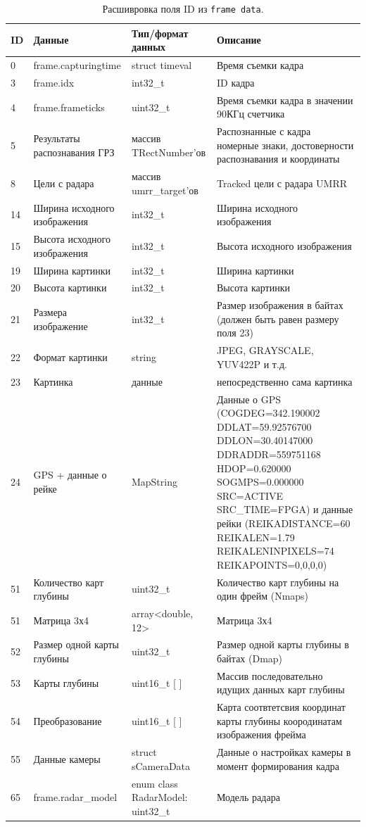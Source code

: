 \documentclass[specification,annotation,times]{itmo-student-thesis}
\begin{document}
	\begin{center}
		\begin{longtable}{|p{}|p{}|p{}|p{}|}
			\caption{Расшивровка поля ID из \texttt{frame data}.}\label{tb1:frame-data} \\ \hline
			\textbf{ID}	&\textbf{Данные}&\textbf{Тип/формат данных}&\textbf{Описание}\\\hline\hline
			0	&frame.capturingtime&	struct timeval	&Время съемки кадра\\\hline
			3	&frame.idx	&int32\_t&	ID кадра\\\hline
			4	&frame.frameticks	&uint32\_t&	Время съемки кадра в значении 90КГц счетчика\\\hline
			5	&Результаты распознавания ГРЗ	&массив TRectNumber'ов	&Распознанные с кадра номерные знаки, достоверности распознавания и координаты\\\hline
			8	&Цели с радара&	массив umrr\_target'ов&	Tracked цели с радара UMRR\\\hline
			14	&Ширина исходного изображения&	int32\_t	&Ширина исходного изображения\\\hline
			15	&Высота исходного изображения	&int32\_t&	Высота исходного изображения\\\hline
			19&	Ширина картинки	&int32\_t	&Ширина картинки\\\hline
			20	&Высота картинки	&int32\_t&	Высота картинки\\\hline
			21	&Размера изображение&	int32\_t	&Размер изображения в байтах (должен быть равен размеру поля 23)\\\hline
			22	&Формат картинки&	string	&JPEG, GRAYSCALE, YUV422P и т.д.\\\hline
			23&	Картинка&	данные&	непосредственно сама картинка\\\hline
			24	&GPS + данные о рейке&	MapString	&Данные о GPS (COGDEG=342.190002 DDLAT=59.92576700 DDLON=30.40147000 DDRADDR=559751168 HDOP=0.620000 SOGMPS=0.000000 SRC=ACTIVE SRC\_TIME=FPGA) и данные рейки (REIKADISTANCE=60 REIKALEN=1.79 REIKALENINPIXELS=74 REIKAPOINTS=0,0,0,0)\\\hline
			51&	Количество карт глубины	&uint32\_t	&Количество карт глубины на один фрейм (Nmaps)\\\hline
			51&	Матрица 3х4	&array<double, 12>	&Матрица 3х4\\\hline
			52	&Размер одной карты глубины	&uint32\_t	&Размер одной карты глубины в байтах (Dmap)\\\hline
			53&	Карты глубины	&uint16\_t [ ]&	Массив последовательно идущих данных карт глубины\\\hline
			54	&Преобразование	&uint16\_t [ ]&	Карта соотвтетсвия координат карты глубины коородинатам изображения фрейма\\\hline
			55&	Данные камеры&	struct sCameraData	&Данные о настройках камеры в момент формирования кадра\\\hline
			65&	frame.radar\_model&	enum class RadarModel: uint32\_t	&Модель радара\\\hline
		\end{longtable}
	\end{center}
	
\end{document}
